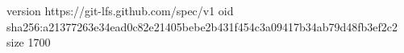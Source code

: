 version https://git-lfs.github.com/spec/v1
oid sha256:a21377263e34ead0c82e21405bebe2b431f454c3a09417b34ab79d48fb3ef2c2
size 1700
